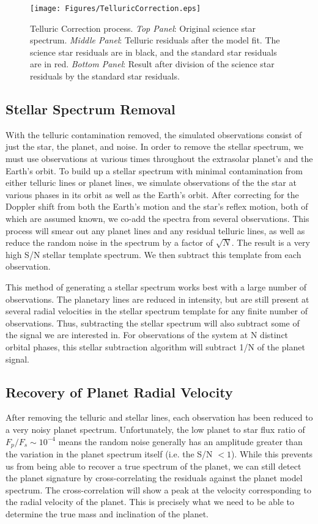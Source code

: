 \documentclass[11pt]{report}     %
\begin{document}
\begin{figure}[ht]
  \centering
  \texttt{[image: Figures/TelluricCorrection.eps]}
  \caption{Telluric Correction process. \emph{Top Panel}: Original
    science star spectrum.  \emph{Middle Panel}: Telluric residuals
    after the model fit. The science star residuals are in black, and
    the standard star residuals are in red. \emph{Bottom Panel}:
    Result after division of the science star residuals by the
    standard star residuals.}
  \label{fig:tellcorr}
\end{figure}

\subsection{Stellar Spectrum Removal}
\label{sec:stellar}
With the telluric contamination removed, the simulated observations
consist of just the star, the planet, and noise. In order to remove
the stellar spectrum, we must use observations at various times
throughout the extrasolar planet's and the Earth's orbit. To build up a stellar spectrum with minimal contamination from either telluric
lines or planet lines, we simulate observations of the the star at
various phases in its orbit as well as the Earth's orbit. After
correcting for the Doppler shift from both the Earth's motion and the star's
reflex motion, both of which are assumed known, we co-add the spectra from several observations. This
process will smear out any planet lines and any residual telluric 
lines, as well as reduce the random noise in the spectrum by a 
factor of $\sqrt{N}$. The result 
is a very high S/N stellar template spectrum. We then subtract this 
template from each observation. 

This method of generating a stellar spectrum works best with a large
number of observations. The planetary lines are reduced in intensity,
but are still present at several radial velocities in the stellar
spectrum template for any finite number of observations. Thus,
subtracting the stellar spectrum will also subtract some of the signal
we are interested in. For observations of the system at N distinct orbital
phases, this stellar subtraction algorithm will subtract 1/N of the
planet signal.


\subsection{Recovery of Planet Radial Velocity}
\label{sec:rv_recovery}
After removing the telluric and stellar lines, each observation has
been reduced to a very noisy planet spectrum. Unfortunately, the low
planet to star flux ratio of $F_p/F_s \sim 10^{-4}$ means the
random noise generally has an amplitude greater than the variation in
the planet spectrum itself (i.e. the S/N $<1$). While this prevents us from being able to
recover a true spectrum of the planet, we can still detect the planet
signature by cross-correlating the residuals against the planet model
spectrum. The cross-correlation will show a peak at the velocity
corresponding to the radial velocity of the planet. This is precisely 
what we need to be able to determine the true mass and inclination of 
the planet. 
\end{document}
